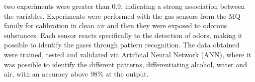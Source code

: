 \documentclass[12pt,a4paper]{article}
\begin{document}
{                                      two experiments were greater than 0.9, indicating a strong association between the variables. 
                                      Experiments were performed with the gas sensors from the MQ family for calibration in clean 
                                      air and then they were exposed to odorous substances. Each sensor reacts specifically to the 
                                      detection of odors, making it possible to identify the gases through pattern recognition. The data 
                                      obtained were trained, tested and validated via Artificial Neural Network (ANN), where it was possible 
                                      to identify the different patterns, differentiating alcohol, water and air, with an accuracy above 98\% 
                                      at the output.}
\end{document}
